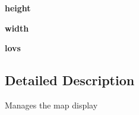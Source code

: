 \begin{DoxyCompactItemize}
\item 
\hypertarget{classcursescli_1_1_map_view_a1eed8a9ef52733425bb74eb94e07e489}{{\bfseries height}}\label{classcursescli_1_1_map_view_a1eed8a9ef52733425bb74eb94e07e489}

\item 
\hypertarget{classcursescli_1_1_map_view_afb8f02cef99f0992dd9ada3fbd06717d}{{\bfseries width}}\label{classcursescli_1_1_map_view_afb8f02cef99f0992dd9ada3fbd06717d}

\item 
\hypertarget{classcursescli_1_1_map_view_a01a37b6f91f22f3ff84af5be95135c52}{{\bfseries lovs}}\label{classcursescli_1_1_map_view_a01a37b6f91f22f3ff84af5be95135c52}

\end{DoxyCompactItemize}


\subsection{\-Detailed \-Description}
\begin{DoxyVerb}Manages the map display \end{DoxyVerb}
 

